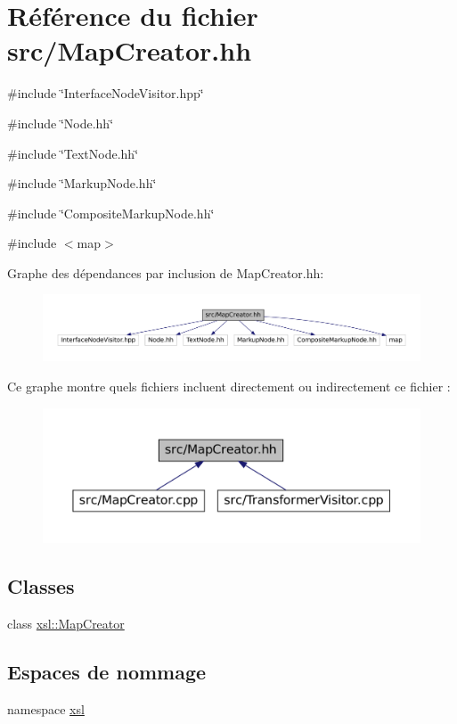 \hypertarget{_map_creator_8hh}{
\section{Référence du fichier src/MapCreator.hh}
\label{_map_creator_8hh}
}
{\ttfamily \#include \char`\"{}InterfaceNodeVisitor.hpp\char`\"{}}\par
{\ttfamily \#include \char`\"{}Node.hh\char`\"{}}\par
{\ttfamily \#include \char`\"{}TextNode.hh\char`\"{}}\par
{\ttfamily \#include \char`\"{}MarkupNode.hh\char`\"{}}\par
{\ttfamily \#include \char`\"{}CompositeMarkupNode.hh\char`\"{}}\par
{\ttfamily \#include $<$map$>$}\par
Graphe des dépendances par inclusion de MapCreator.hh:\nopagebreak
\begin{figure}[H]
\begin{center}
\leavevmode
\includegraphics[width=400pt]{_map_creator_8hh__incl}
\end{center}
\end{figure}
Ce graphe montre quels fichiers incluent directement ou indirectement ce fichier :\nopagebreak
\begin{figure}[H]
\begin{center}
\leavevmode
\includegraphics[width=400pt]{_map_creator_8hh__dep__incl}
\end{center}
\end{figure}
\subsection*{Classes}
\begin{DoxyCompactItemize}
\item 
class \hyperlink{classxsl_1_1_map_creator}{xsl::MapCreator}
\end{DoxyCompactItemize}
\subsection*{Espaces de nommage}
\begin{DoxyCompactItemize}
\item 
namespace \hyperlink{namespacexsl}{xsl}
\end{DoxyCompactItemize}
